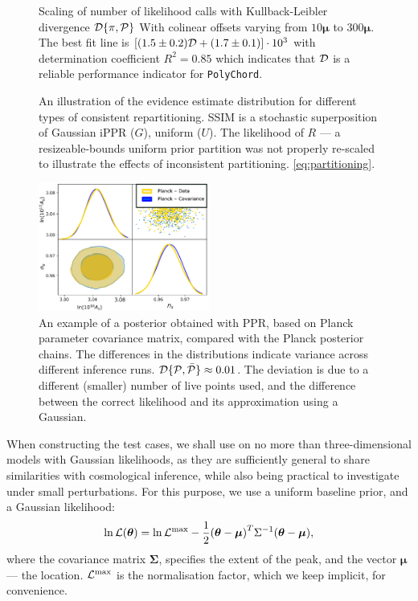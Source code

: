 \documentclass[usenatbib]{mnras}
\begin{document}
\begin{figure}
  
  \caption{Scaling of number of likelihood calls with Kullback-Leibler
    divergence \({\cal D}\{ \pi, {\cal P}\}\) With colinear offsets
    varying from $10\bm{\mu}$ to $300\bm{\mu}$. The best fit line is
    \(\left[(1.5 \pm 0.2) {\cal D} + (1.7 \pm 0.1)\right]\cdot 10^3 \)
    with determination coefficient \(R^{2} = 0.85\) which indicates
    that \({\cal D}\) is a reliable performance indicator for
    \texttt{PolyChord}.\label{fig:kl-scaling}}
\end{figure}


\begin{figure}

\caption{An illustration of the evidence estimate distribution for
  different types of consistent repartitioning. SSIM is a stochastic
  superposition of Gaussian iPPR (\(G\)), uniform (\(U\)). The
  likelihood of \(R\) --- a resizeable-bounds uniform prior partition
  was not properly re-scaled to illustrate the effects of inconsistent
  partitioning.   \cref{eq:partitioning}. \label{fig:hist}}
\end{figure}




\begin{figure}
  \includegraphics[width=0.5\textwidth]{./illustrations/triangle-fit.pdf}
  \caption{An example of a posterior obtained with PPR, based on
    Planck parameter covariance matrix, compared with the Planck
    posterior chains. The differences in the distributions indicate
    variance across different inference runs.
    ${\cal D}\{ {\cal P}, \bar{\cal P}\} \approx 0.01$. The deviation
    is due to a different (smaller) number of live points used, and
    the difference between the correct likelihood and its
    approximation using a Gaussian. \label{fig:overlay-posteriors}}
\end{figure}


When constructing the test cases, we shall use on no more than
three-dimensional models with Gaussian likelihoods, as they are
sufficiently general to share similarities with cosmological
inference, while also being practical to investigate under small
perturbations.  For this purpose, we use a uniform baseline prior, and
a Gaussian likelihood:
\begin{equation}
  \ln {\cal L}(\bm{\theta}) = \ln {\cal L}^\text{max}- \dfrac{1}{2}{(\bm{\theta} - \bm{\mu})}^{T}\Sigma^{-1}(\bm{\theta}-\bm{\mu}),
\end{equation}
where the covariance matrix \(\bm{\Sigma}\), specifies the extent of
the peak, and the vector \(\bm{\mu}\) --- the location.
\({\cal L}^\text{max}\) is the normalisation factor, which we keep
implicit, for convenience.
\end{document}
